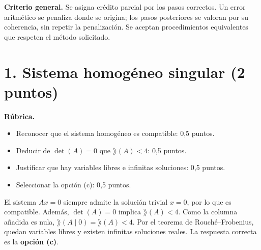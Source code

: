 \documentclass[10pt,a4]{examenEPN0}
\begin{document}
\encabezado
\noindent\textbf{Criterio general.} Se asigna crédito parcial por los pasos
correctos. Un error aritmético se penaliza donde se origina; los pasos
posteriores se valoran por su coherencia, sin repetir la penalización.
Se aceptan procedimientos equivalentes que respeten el método solicitado.

\section*{1. Sistema homogéneo singular (2 puntos)}
\noindent\textbf{Rúbrica.}
\begin{itemize}[itemsep=2pt]
    \item Reconocer que el sistema homogéneo es compatible: 0,5 puntos.
    \item Deducir de $\det(A)=0$ que $\rang(A)<4$: 0,5 puntos.
    \item Justificar que hay variables libres e infinitas soluciones: 0,5 puntos.
    \item Seleccionar la opción (c): 0,5 puntos.
\end{itemize}
El sistema $Ax=0$ siempre admite la solución trivial $x=0$, por lo que
es compatible. Además, $\det(A)=0$ implica $\rang(A)<4$. Como la columna
añadida es nula, $\rang(A\mid0)=\rang(A)<4$. Por el teorema de
Rouché--Frobenius, quedan variables libres y existen infinitas soluciones
reales. La respuesta correcta es la \textbf{opción (c)}.
\end{document}
